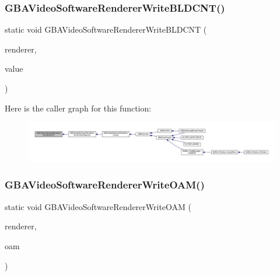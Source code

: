 \subsubsection{\texorpdfstring{G\+B\+A\+Video\+Software\+Renderer\+Write\+B\+L\+D\+C\+N\+T()}{GBAVideoSoftwareRendererWriteBLDCNT()}}
{\footnotesize\ttfamily static void G\+B\+A\+Video\+Software\+Renderer\+Write\+B\+L\+D\+C\+NT (\begin{DoxyParamCaption}\item[{struct G\+B\+A\+Video\+Software\+Renderer $\ast$}]{renderer,  }\item[{uint16\+\_\+t}]{value }\end{DoxyParamCaption})\hspace{0.3cm}{\ttfamily [static]}}

Here is the caller graph for this function\+:
\nopagebreak
\begin{figure}[H]
\begin{center}
\leavevmode
\includegraphics[width=350pt]{video-software_8c_a2de98467eb997a1977e7e69846dc8a67_icgraph}
\end{center}
\end{figure}
\mbox{\label{video-software_8c_a3e1a51d28182f9f3b3e2db089e275e2a}} 
\subsubsection{\texorpdfstring{G\+B\+A\+Video\+Software\+Renderer\+Write\+O\+A\+M()}{GBAVideoSoftwareRendererWriteOAM()}}
{\footnotesize\ttfamily static void G\+B\+A\+Video\+Software\+Renderer\+Write\+O\+AM (\begin{DoxyParamCaption}\item[{struct G\+B\+A\+Video\+Renderer $\ast$}]{renderer,  }\item[{uint32\+\_\+t}]{oam }\end{DoxyParamCaption})\hspace{0.3cm}{\ttfamily [static]}}

